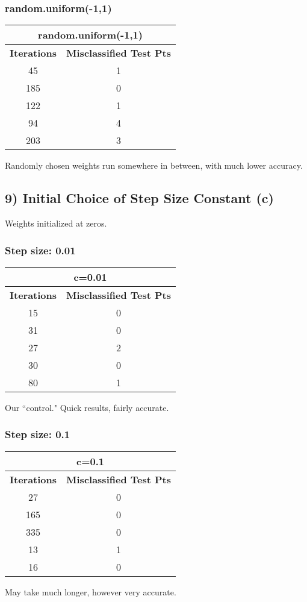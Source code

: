 \documentclass{article}
\begin{document}
\subsubsection*{random.uniform(-1,1)}
\begin{center}
\begin{tabular}{|c|c|}
	\hline
	\multicolumn{2}{|c|}{\textbf{random.uniform(-1,1)}} \\\hline
	\textbf{Iterations} & \textbf{Misclassified Test Pts} \\\hline
	45 & 1 \\
	185 & 0\\
	122 & 1 \\
	94 & 4\\
	203 & 3\\
	\hline
\end{tabular}
\end{center}
Randomly chosen weights run somewhere in between, with much lower accuracy. \\

\newpage
\subsection*{9) Initial Choice of Step Size Constant (c)}
Weights initialized at zeros.


\subsubsection*{Step size: 0.01}
\begin{center}
\begin{tabular}{|c|c|}
	\hline
	\multicolumn{2}{|c|}{\textbf{c=0.01}} \\\hline
	\textbf{Iterations} & \textbf{Misclassified Test Pts} \\\hline
	15 & 0 \\
	31 & 0\\
	27 & 2 \\
	30 & 0\\
	80 & 1\\
	\hline
\end{tabular}
\end{center}
Our ``control." Quick results, fairly accurate.


\subsubsection*{Step size: 0.1}
\begin{center}
\begin{tabular}{|c|c|}
	\hline
	\multicolumn{2}{|c|}{\textbf{c=0.1}} \\\hline
	\textbf{Iterations} & \textbf{Misclassified Test Pts} \\\hline
	27 & 0 \\
	165 & 0\\
	335 & 0 \\
	13 & 1\\
	16 & 0\\
	\hline
\end{tabular}
\end{center}
May take much longer, however very accurate.
\end{document}

